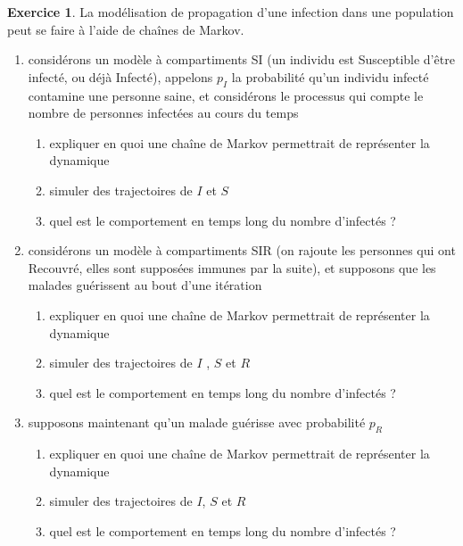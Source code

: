 \documentclass[10pt,fleqn]{article}
\theoremstyle{definition}
\newtheorem{exo}{Exercice}
\begin{document}
\begin{exo}
La modélisation de propagation d'une infection dans une population peut se faire à l'aide de chaînes de Markov.
\begin{enumerate}
	\item considérons un modèle à compartiments SI (un individu est Susceptible d'être infecté, ou déjà Infecté), appelons $p_I$ la probabilité qu'un individu infecté contamine une personne saine, et considérons le processus qui compte le nombre de personnes infectées au cours du temps
		\begin{enumerate} 
			\item expliquer en quoi une chaîne de Markov permettrait de représenter la dynamique
			\item simuler des trajectoires de $I$ et $S$
			\item quel est le comportement en temps long du nombre d'infectés ?
		\end{enumerate}
	\item considérons un modèle à compartiments SIR  (on rajoute les personnes qui ont Recouvré, elles sont supposées immunes par la suite), et supposons que les malades guérissent au bout d'une itération
		\begin{enumerate} 
			\item expliquer en quoi une chaîne de Markov permettrait de représenter la dynamique
			\item simuler des trajectoires de $I$ , $S$ et $R$
			\item quel est le comportement en temps long du nombre d'infectés ?
		\end{enumerate}	
	\item  supposons maintenant qu'un malade guérisse avec  probabilité $p_R$
		\begin{enumerate} 
			\item expliquer en quoi une chaîne de Markov permettrait de représenter la dynamique
			\item simuler des trajectoires de $I$, $S$ et $R$
			\item quel est le comportement en temps long du nombre d'infectés ?
		\end{enumerate}	
\end{enumerate}
\end{exo}
\end{document}
